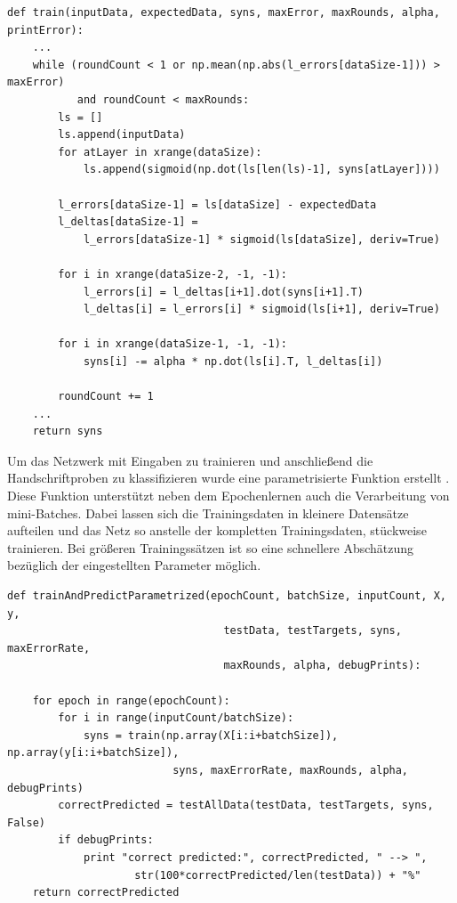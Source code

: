 \newpage

\begin{lstlisting}[caption={Trainieren des Netzes},label={train}]
def train(inputData, expectedData, syns, maxError, maxRounds, alpha, printError):
    ...
    while (roundCount < 1 or np.mean(np.abs(l_errors[dataSize-1])) > maxError) 
           and roundCount < maxRounds:
        ls = []
        ls.append(inputData)
        for atLayer in xrange(dataSize):
            ls.append(sigmoid(np.dot(ls[len(ls)-1], syns[atLayer])))
        
        l_errors[dataSize-1] = ls[dataSize] - expectedData
        l_deltas[dataSize-1] = 
            l_errors[dataSize-1] * sigmoid(ls[dataSize], deriv=True)
        
        for i in xrange(dataSize-2, -1, -1):
            l_errors[i] = l_deltas[i+1].dot(syns[i+1].T)
            l_deltas[i] = l_errors[i] * sigmoid(ls[i+1], deriv=True)
            
        for i in xrange(dataSize-1, -1, -1):   
            syns[i] -= alpha * np.dot(ls[i].T, l_deltas[i])
            
        roundCount += 1
    ...
    return syns
    \end{lstlisting}  
    
Um das Netzwerk mit Eingaben zu trainieren und anschließend die Handschriftproben zu klassifizieren wurde eine parametrisierte Funktion erstellt . Diese Funktion unterstützt neben dem Epochenlernen auch die Verarbeitung von mini-Batches. Dabei lassen sich die Trainingsdaten in kleinere Datensätze aufteilen und das Netz so anstelle der kompletten Trainingsdaten, stückweise trainieren. Bei größeren Trainingssätzen ist so eine schnellere Abschätzung bezüglich der eingestellten Parameter möglich. 
    
\begin{lstlisting}[caption={Trainieren und testen auf Handschriften},label={run}]   
def trainAndPredictParametrized(epochCount, batchSize, inputCount, X, y, 
                                  testData, testTargets, syns, maxErrorRate, 
                                  maxRounds, alpha, debugPrints):
    
    for epoch in range(epochCount):
        for i in range(inputCount/batchSize):
            syns = train(np.array(X[i:i+batchSize]),  np.array(y[i:i+batchSize]), 
                          syns, maxErrorRate, maxRounds, alpha, debugPrints)
        correctPredicted = testAllData(testData, testTargets, syns, False)
        if debugPrints:
            print "correct predicted:", correctPredicted, " --> ", 
                    str(100*correctPredicted/len(testData)) + "%"
    return correctPredicted
\end{lstlisting}  